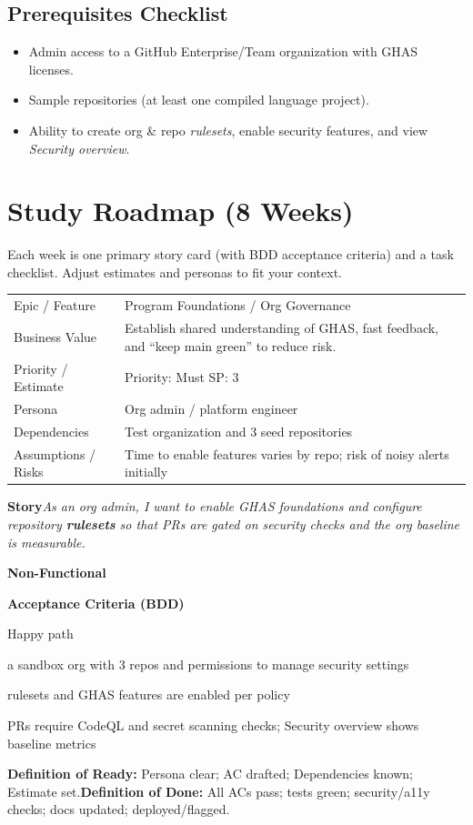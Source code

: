 \documentclass[11pt,a4paper]{article}
\newenvironment{GHASCard}[2]{%
  \begin{tcolorbox}[ghascard,title={\ghasheader{#1 --- #2}}]
  \small
}{%
  \end{tcolorbox}
}
\newcommand{\DoR}{\textbf{Definition of Ready:} Persona clear; AC drafted; Dependencies known; Estimate set.}
\newcommand{\DoD}{\textbf{Definition of Done:} All ACs pass; tests green; security/a11y checks; docs updated; deployed/flagged.}
\begin{document}
\subsection*{Prerequisites Checklist}
\begin{itemize}
  \item Admin access to a GitHub Enterprise/Team organization with GHAS licenses.
  \item Sample repositories (at least one compiled language project).
  \item Ability to create org \& repo \emph{rulesets}, enable security features, and view \emph{Security overview}.
\end{itemize}

\section{Study Roadmap (8 Weeks)}
Each week is one primary story card (with BDD acceptance criteria) and a task checklist. Adjust estimates and personas to fit your context.

\begin{GHASCard}{GHAS-1}{Foundations \& Governance}
\begin{tabularx}{\linewidth}{L V}
Epic / Feature & Program Foundations / Org Governance \tabularnewline
Business Value & Establish shared understanding of GHAS, fast feedback, and ``keep main green'' to reduce risk. \tabularnewline
Priority / Estimate & Priority: Must \quad SP: 3 \tabularnewline
Persona & Org admin / platform engineer \tabularnewline
Dependencies & Test organization and 3 seed repositories \tabularnewline
Assumptions / Risks & Time to enable features varies by repo; risk of noisy alerts initially \tabularnewline
\end{tabularx}

\medskip
\textbf{Story}\quad \emph{As an org admin, I want to enable GHAS foundations and configure repository \textbf{rulesets} so that PRs are gated on security checks and the org baseline is measurable.}

\medskip
\textbf{Non-Functional}\quad
{}\ \ 

\medskip
\textbf{Acceptance Criteria (BDD)}
\begin{description}[leftmargin=2.7cm, labelwidth=2.6cm, style=nextline]
  \item[\textbf{Scenario}] Happy path
  \item[\textbf{Given}] a sandbox org with 3 repos and permissions to manage security settings
  \item[\textbf{When}] rulesets and GHAS features are enabled per policy
  \item[\textbf{Then}] PRs require CodeQL and secret scanning checks; Security overview shows baseline metrics
\end{description}

\medskip
\DoR\quad\textbullet\quad\DoD
\end{GHASCard}
\end{document}
